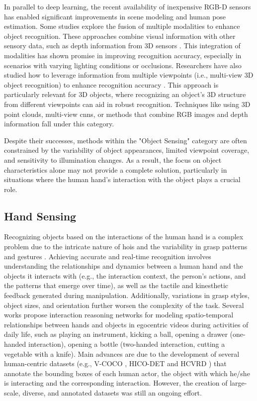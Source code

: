 In parallel to deep learning, the recent availability of inexpensive RGB-D sensors has enabled significant improvements in scene modeling and human pose estimation. Some studies explore the fusion of multiple modalities to enhance object recognition. These approaches combine visual information with other sensory data, such as depth information from 3D sensors \cite{Zimmermann2018,Rato2022}. This integration of modalities has shown promise in improving recognition accuracy, especially in scenarios with varying lighting conditions or occlusions. Researchers have also studied how to leverage information from multiple viewpoints (i.e., multi-view 3D object recognition) to enhance recognition accuracy \cite{Qi2021}. This approach is particularly relevant for 3D objects, where recognizing an object's 3D structure from different viewpoints can aid in robust recognition. Techniques like using 3D point clouds, multi-view \acs{cnn}s, or methods that combine RGB images and depth information fall under this category.

Despite their successes, methods within the "Object Sensing" category are often constrained by the variability of object appearances, limited viewpoint coverage, and sensitivity to illumination changes. As a result, the focus on object characteristics alone may not provide a complete solution, particularly in situations where the human hand's interaction with the object plays a crucial role.

\subsection{Hand Sensing}
Recognizing objects based on the interactions of the human hand is a complex problem due to the intricate nature of \acfp{hoi} and the variability in grasp patterns and gestures \cite{Chao2018,Gkioxari2018,Cao2021,Liu2021}. Achieving accurate and real-time recognition involves understanding the relationships and dynamics between a human hand and the objects it interacts with (e.g., the interaction context, the person's actions, and the patterns that emerge over time), as well as the tactile and kinesthetic feedback generated during manipulation. Additionally, variations in grasp styles, object sizes, and orientation further worsen the complexity of the task. Several works propose interaction reasoning networks for modeling spatio-temporal relationships between hands and objects in egocentric videos during activities of daily life, such as playing an instrument, kicking a ball, opening a drawer (one-handed interaction), opening a bottle (two-handed interaction, cutting a vegetable with a knife). Main advances are due to the development of several human-centric datasets (e.g., V-COCO \cite{Gupta2015}, HICO-DET \cite{Chao2018} and HCVRD \cite{Zhuang2018}) that annotate the bounding boxes of each human actor, the object with which he/she is interacting and the corresponding interaction. However, the creation of large-scale, diverse, and annotated datasets was still an ongoing effort.


